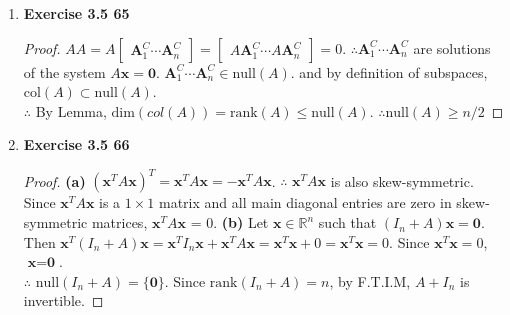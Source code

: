 \begin{enumerate}
\begin{proof}
		Thus, there exists a subset $ C \subset B $ which forms a basis for $ \text{row}(A+B) $. \\
		$ \therefore \text{rank}(A+B)=\left|C\right| \leq \left|\mathcal{B}_1 \cup \mathcal{B}_2 \right| \leq \left|\mathcal{B}_1\right| + \left|\mathcal{B}_2\right| = \text{rank}(A)+\text{rank}(B) $
	\end{proof}
	\item \textbf{Exercise 3.5 65}
	\begin{proof}
		$ AA = A\begin{bmatrix}
		\textbf{A}^C_1 \cdots \textbf{A}^C_n
		\end{bmatrix} = \begin{bmatrix}
		A\textbf{A}^C_1 \cdots A\textbf{A}^C_n
		\end{bmatrix} = 0$. $ \therefore \textbf{A}^C_1 \cdots \textbf{A}^C_n $ are solutions of the system $ A\textbf{x}=\textbf{0} $. $ \textbf{A}^C_1 \cdots \textbf{A}^C_n \in \text{null}(A) $. and by definition of subspaces, $ \text{col}(A) \subset \text{null}(A) $. \\
		$ \therefore $ By Lemma, $ \text{dim}\left(col(A)\right) = \text{rank}(A) \leq \text{null}(A) $. $ \therefore \text{null}(A) \geq n/2 $
	\end{proof}
	\item \textbf{Exercise 3.5 66}
	\begin{proof}
		\noindent \textbf{(a)}
		$ \left(\textbf{x}^TA\textbf{x}\right)^T = \textbf{x}^T A\textbf{x} = -\textbf{x}^T A \textbf{x} $. $ \therefore $ $ \textbf{x}^T A \textbf{x} $ is also skew-symmetric. Since $ \textbf{x}^T A \textbf{x} $ is a $ 1\times 1 $ matrix and all main diagonal entries are zero in skew-symmetric matrices, $ \textbf{x}^T A \textbf{x} $ = 0.
		\noindent \textbf{(b)}
		Let $ \textbf{x}\in \mathbb{R}^n $ such that $ \left(I_n+A\right)\textbf{x}=\textbf{0} $. Then $ \textbf{x}^T\left(I_n+A\right)\textbf{x} = \textbf{x}^T I_n \textbf{x} + \textbf{x}^T A \textbf{x} = \textbf{x}^T\textbf{x}+0 = \textbf{x}^T \textbf{x} = 0$. Since $ \textbf{x}^T\textbf{x}=0 $, $ \textbf{x}=\textbf{0} $. \\
		$ \therefore $ $ \text{null}(I_n+A)=\{\textbf{0}\} $. Since $ \text{rank}(I_n+A)=n $, by F.T.I.M, $ A+I_n $ is invertible.
	\end{proof}
\end{enumerate}